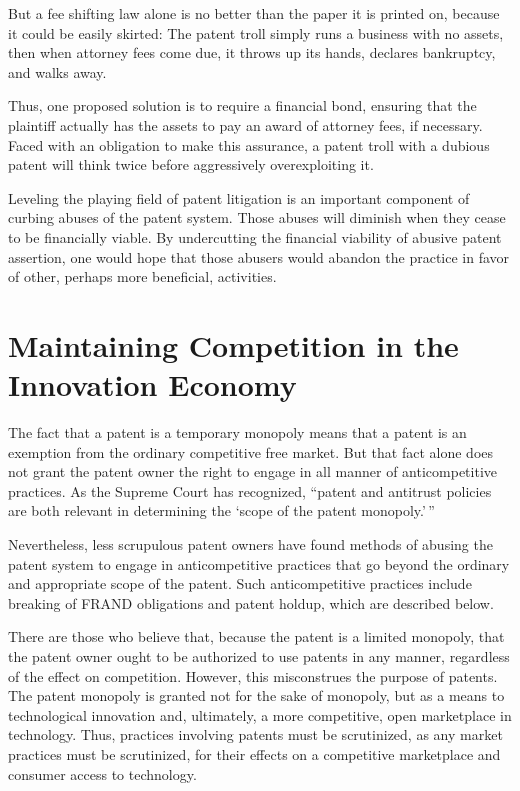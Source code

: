 \documentclass[11pt,twocolumn,titlepage]{article}
\begin{document}
But a fee shifting law alone is no better than the paper it is printed on,
because it could be easily skirted: The patent troll simply runs a business with
no assets, then when attorney fees come due, it throws up its hands, declares
bankruptcy, and walks away.

Thus, one proposed solution is to require a financial bond, ensuring that the
plaintiff actually has the assets to pay an award of attorney fees, if
necessary. Faced with an obligation to make this assurance, a patent troll with
a dubious patent will think twice before aggressively overexploiting it.

Leveling the playing field of patent litigation is an important component of
curbing abuses of the patent system. Those abuses will diminish when they
cease to be
financially viable. By undercutting the financial viability of abusive
patent assertion, one would hope that those abusers would abandon the practice
in favor of other, perhaps more beneficial, activities.

\section{Maintaining Competition in the Innovation Economy}
\SectionNote
{}

The fact that a patent is a temporary monopoly means that a patent is an
exemption from the ordinary competitive free market.
But that fact alone does
not grant the patent owner the right to engage in all manner of anticompetitive
practices. As the Supreme Court has recognized, ``patent and antitrust policies
are both relevant in determining the `scope of the patent
monopoly.'\,''

Nevertheless, less scrupulous patent owners have found methods of
abusing the patent system to engage in anticompetitive practices that go beyond
the ordinary and appropriate scope of the patent. Such anticompetitive
practices include breaking of FRAND obligations
and patent holdup, which are described below.

There are those who believe that, because the patent is a limited monopoly,
that the patent owner ought to be authorized to use patents in any manner,
regardless of the effect on competition. However, this misconstrues the purpose
of patents. The patent monopoly is granted not for the sake of monopoly, but as
a means to technological innovation and, ultimately, a more competitive, open
marketplace in technology. Thus, practices involving patents must be
scrutinized, as any market practices must be scrutinized, for their effects on
a competitive marketplace and consumer access to technology.
\end{document}
